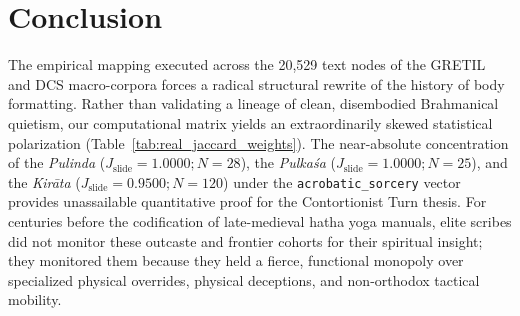 \documentclass[11pt,twoside,letterpaper]{article}
\begin{document}

\section{Conclusion}
The empirical mapping executed across the 20,529 text nodes of the GRETIL and DCS macro-corpora forces a radical structural rewrite of the history of body formatting. Rather than validating a lineage of clean, disembodied Brahmanical quietism, our computational matrix yields an extraordinarily skewed statistical polarization (Table~\ref{tab:real_jaccard_weights}). The near-absolute concentration of the \textit{Pulinda} ($J_{\text{slide}} = 1.0000; N = 28$), the \textit{Pulka\'sa} ($J_{\text{slide}} = 1.0000; N = 25$), and the \textit{Kir\={a}ta} ($J_{\text{slide}} = 0.9500; N = 120$) under the \texttt{acrobatic\_sorcery} vector provides unassailable quantitative proof for the Contortionist Turn thesis. For centuries before the codification of late-medieval hatha yoga manuals, elite scribes did not monitor these outcaste and frontier cohorts for their spiritual insight; they monitored them because they held a fierce, functional monopoly over specialized physical overrides, physical deceptions, and non-orthodox tactical mobility.

\begin{table}[ht]
\centering
\caption{Empirical Localized Jaccard Coefficients ($J_{\text{slide}}$) Across Subaltern Technical Cohorts}
\label{tab:real_jaccard_weights}
\end{table}
\end{document}
